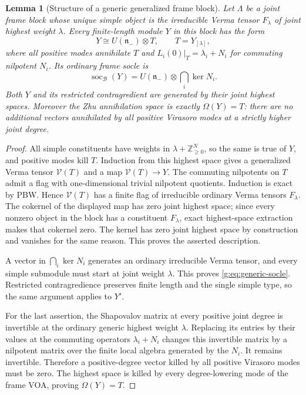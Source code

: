 \documentclass[11pt,a4paper]{article}
\numberwithin{equation}{section}
\newtheorem{lemma}[theorem]{Lemma}
\theoremstyle{definition}\newtheorem{definition}[theorem]{Definition}
\theoremstyle{remark}\newtheorem{remark}[theorem]{Remark}
\begin{document}
\begin{lemma}[Structure of a generic generalized frame block]
\label{g:lem:generic-generalized-Verma}
Let $\Lambda$ be a joint frame block whose unique simple object is the
irreducible Verma tensor $F_\lambda$ of joint highest weight $\lambda$.
Every finite-length module $Y$ in this block has the form
\[
 Y\cong U(\mathfrak n_-)\otimes T,
 \qquad T=Y_{[\lambda]},
\]
where all positive modes annihilate $T$ and
$L_i(0)|_T=\lambda_i+N_i$ for commuting nilpotent $N_i$.
Its ordinary frame socle is
\begin{equation}
 \operatorname{soc}_{\mathcal B}(Y)
  =U(\mathfrak n_-)\otimes\bigcap_i\ker N_i.          \label{g:eq:generic-socle}
\end{equation}
Both $Y$ and its restricted contragredient are generated by their
joint highest spaces.  Moreover the Zhu annihilation space is exactly
$\Omega(Y)=T$: there are no additional vectors annihilated by all
positive Virasoro modes at a strictly higher joint degree.
\end{lemma}
\begin{proof}
All simple constituents have weights in
$\lambda+\mathbb Z_{\geq0}^N$, so the same is true of $Y$, and positive
modes kill $T$.  Induction from this highest space gives a generalized
Verma tensor $\mathcal V(T)$ and a map $\mathcal V(T)\to Y$.
The commuting nilpotents on $T$ admit a flag with one-dimensional trivial
nilpotent quotients.  Induction is exact by PBW.  Hence $\mathcal V(T)$
has a finite flag of irreducible ordinary Verma tensors $F_\lambda$.
The cokernel of the displayed map has zero joint highest space; since
every nonzero object in the block has a constituent $F_\lambda$, exact
highest-space extraction makes that cokernel zero.  The kernel has
zero joint highest space by construction and vanishes for the same
reason.  This proves the asserted description.

A vector in $\bigcap_i\ker N_i$ generates an ordinary irreducible
Verma tensor, and every simple submodule must start at joint weight
$\lambda$.  This proves \eqref{g:eq:generic-socle}.  Restricted contragredience preserves
finite length and the single simple type, so the same argument applies
to $Y'$.

For the last assertion, the Shapovalov matrix at every positive joint
degree is invertible at the ordinary generic highest weight $\lambda$.
Replacing its entries by their values at the commuting operators
$\lambda_i+N_i$ changes this invertible matrix by a nilpotent matrix
over the finite local algebra generated by the $N_i$.  It remains
invertible.  Therefore a positive-degree vector killed by all positive
Virasoro modes must be zero.  The highest space is killed by every
degree-lowering mode of the frame VOA, proving $\Omega(Y)=T$.
\end{proof}
\end{document}
